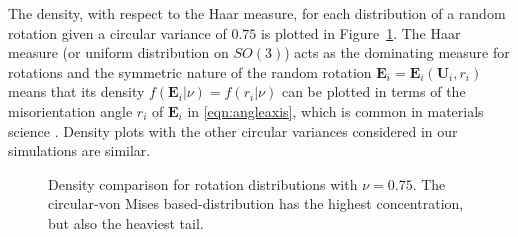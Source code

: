 The density, with respect to the Haar measure, for each distribution of a random rotation given a circular variance of $0.75$ is plotted in Figure~\ref{fig:Haar}.  The Haar measure (or uniform distribution on $SO(3)$) acts as the dominating measure for rotations and the symmetric nature of the random rotation $\bm E_i=\bm E_i(\bm U_i,r_i)$ means that its density $f(\bm E_i|\nu)=f(r_i|\nu)$ can be plotted in terms of the misorientation angle $r_i$ of $\bm E_i$ in \eqref{eqn:angleaxis}, which is common in materials science \citep{matthies88, savyolova95}.  Density plots with the other circular variances considered in our simulations are similar.


\begin{figure}[h!]
\centering
{}
\caption{Density comparison for rotation distributions with $\nu=0.75$.  The circular-von Mises based-distribution has the highest concentration, but also the heaviest tail.}
\label{fig:Haar}
\end{figure}

